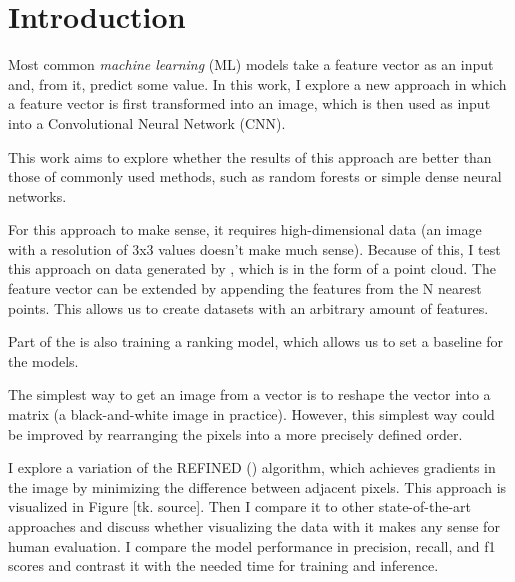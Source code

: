 \chapter*{Introduction}

Most common \textit{machine learning} (ML) models take a feature vector as an input and, from it, predict some value. In this work, I explore a new approach in which a feature vector is first transformed into an image, which is then used as input into a Convolutional Neural Network (CNN).

This work aims to explore whether the results of this approach are better than those of commonly used methods, such as random forests or simple dense neural networks.

For this approach to make sense, it requires high-dimensional data (an image with a resolution of 3x3 values doesn't make much sense). Because of this, I test this approach on data generated by \cite{P2RANK}, which is in the form of a point cloud. The feature vector can be extended by appending the features from the N nearest points. This allows us to create datasets with an arbitrary amount of features.

Part of the \cite{P2RANK} is also training a ranking model, which allows us to set a baseline for the models.

The simplest way to get an image from a vector is to reshape the vector into a matrix (a black-and-white image in practice). However, this simplest way could be improved by rearranging the pixels into a more precisely defined order.

I explore a variation of the REFINED (\cite{REFINED}) algorithm, which achieves gradients in the image by minimizing the difference between adjacent pixels. This approach is visualized in Figure [tk. source]. Then I compare it to other state-of-the-art approaches and discuss whether visualizing the data with it makes any sense for human evaluation. I compare the model performance in precision, recall, and f1 scores and contrast it with the needed time for training and inference. 